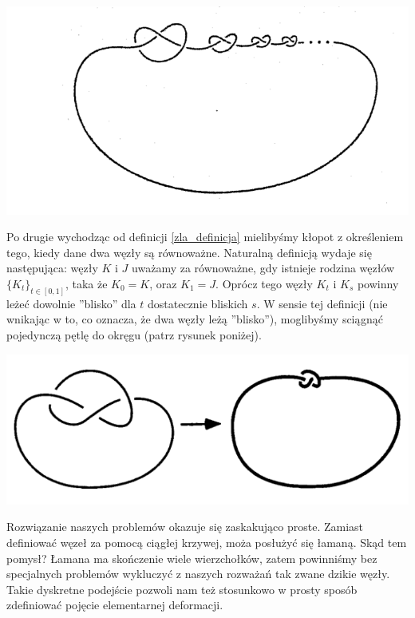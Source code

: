 	\begin{center}

	\includegraphics[scale=0.3]{1/pictures/wild.png}
	\end{center}


Po drugie wychodząc od definicji \ref{zla_definicja} mielibyśmy kłopot z określeniem tego, kiedy dane dwa węzły są równoważne. Naturalną definicją wydaje się
następująca: węzły $K$ i $J$ uważamy za równoważne, gdy istnieje rodzina węzłów $\lbrace K_t\rbrace_{t\in[0,1]}$, taka że $K_0 = K$, oraz $K_1 = J$. Oprócz tego 
węzły $K_t$ i $K_s$ powinny leżeć dowolnie ''blisko'' dla $t$ dostatecznie bliskich $s$. W sensie tej definicji (nie wnikając w to, co oznacza,
że dwa węzły leżą ''blisko''), moglibyśmy sciągnąć pojedynczą pętlę do okręgu (patrz rysunek poniżej). 

\begin{minipage}{0.3\textwidth}
	\begin{center}
	
	\includegraphics[scale=0.5]{1/pictures/loop.png} 
	\end{center}
	\end{minipage}

Rozwiązanie naszych problemów okazuje się zaskakująco proste. Zamiast definiować węzeł za pomocą ciągłej krzywej, moża posłużyć się łamaną. Skąd tem pomysł? Łamana ma skończenie wiele
wierzchołków, zatem powinniśmy bez specjalnych problemów wykluczyć z naszych rozważań tak zwane dzikie węzły. Takie dyskretne podejście pozwoli nam też stosunkowo w prosty sposób zdefiniować
pojęcie elementarnej deformacji.



